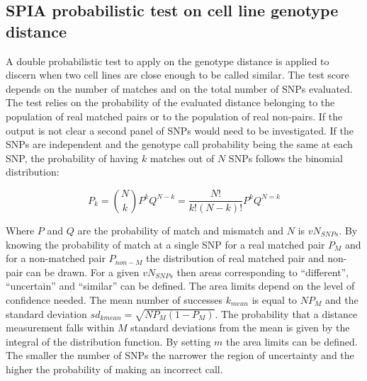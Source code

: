 	\subsection{SPIA probabilistic test on cell line genotype distance}
	A double probabilistic test to apply on the genotype distance is applied to discern when two cell lines are close enough to be called similar.
	The test score depends on the number of matches and on the total number of SNPs evaluated.
	The test relies on the probability of the evaluated distance belonging to the population of real matched pairs or to the population of real non-pairs.
	If the output is not clear a second panel of SNPs would need to be investigated.
	If the SNPs are independent and the genotype call probability being the same at each SNP, the probability of having $k$ matches out of $N$ SNPs follows the binomial distribution:

	$$P_k = \binom{N}{k} P^kQ^{N-k} = \frac{N!}{k!(N-k)!}P^kQ^{N=k}$$

	Where $P$ and $Q$ are the probability of match and mismatch and $N$ is $vN_{SNPs}$.
	By knowing the probability of match at a single SNP for a real matched pair $P_M$ and for a non-matched pair $P_{non-M}$ the distribution of real matched pair and non-pair can be drawn.
	For a given $vN_{SNPs}$ then areas corresponding to ``different'', ``uncertain'' and ``similar'' can be defined.
	The area limits depend on the level of confidence needed.
	The mean number of successes $k_{mean}$ is equal to $NP_M$ and the standard deviation $sd_{kmean} = \sqrt{NP_M(1-P_M)}$.
	The probability that a distance measurement falls within $M$ standard deviations from the mean is given by the integral of the distribution function.
	By setting $m$ the area limits can be defined.
	The smaller the number of SNPs the narrower the region of uncertainty and the higher the probability of making an incorrect call.
